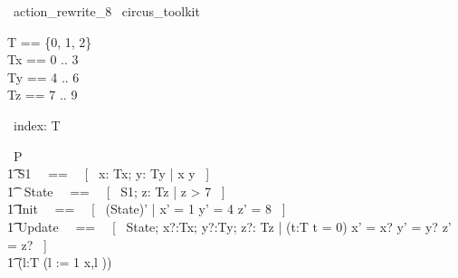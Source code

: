 % 
\begin{zsection}
  \SECTION\ action\_rewrite\_8 \parents\ circus\_toolkit
\end{zsection}

\begin{zed}
    T == \{0, 1, 2\} \\
	Tx == 0 .. 3 \\ 
	Ty == 4 .. 6 \\ 
	Tz == 7 .. 9 \\ 
\end{zed}

\begin{circus}
	\circchannel\ index: T \\
\end{circus}

\begin{circus}
    \circprocess\ P \circdef \circbegin \\
        \t1 S1 ~~==~~ [~  x: Tx; y: Ty | x  \land y  ~] \\
        \t1 \circstate\ State ~~==~~ [~ S1; z: Tz | z > 7 ~] \\
        \t1 Init ~~==~~ [~ (State)' | x' = 1 \land y' = 4 \land z' = 8 ~] \\
        \t1 Update ~~==~~ [~ \Delta State; x?:Tx; y?:Ty; z?: Tz | (\exists t:T \spot t = 0) \land x' = x? \land y' = y? \land z' = z? ~] \\
        \t1 \circspot (\circvar l:T \circspot (l := 1 \circseq x,l \prefixcolon [~ x > 0 \land y \leq 5 \land l = 1, x' = l \land l' = 0 \land y' = z - 3 \land z' \geq 8 ~])) \\
	\circend
\end{circus}

